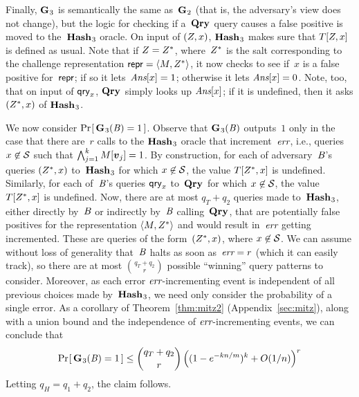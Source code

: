 {Finally, $\textup{\textbf{G}}\hspace{0.5pt}_3$ is semantically the same as~$\textup{\textbf{G}}\hspace{0.5pt}_2$ (that is, the adversary's
view does not change), but the logic for checking if a~$\textup{\textbf{Qry}}\hspace{0.5pt}$ query
causes a false positive is moved to the~$\textup{\textbf{Hash}}\hspace{0.5pt}_3$ oracle.
%
On input of $(Z, x)$, $\textup{\textbf{Hash}}\hspace{0.5pt}_3$ makes sure that $T[Z,x]$ is
defined as usual. Note that if $Z=Z^*$, where~$Z^*$ is the salt
corresponding to the challenge representation $\pub = \str(M, \salt^*)$, it now
checks to see if~$x$ is a false positive for~$\mathsf{repr}$; if so it lets~$\textit{Ans}[x]=1$;
otherwise it lets $\textit{Ans}[x]=0$.
%
Note, too, that on input of $\mathsf{qry}_x$, $\textup{\textbf{Qry}}\hspace{0.5pt}$ simply looks up $\textit{Ans}[x]$; if it is
undefined, then it asks $(Z^*, x)$ of $\textup{\textbf{Hash}}\hspace{0.5pt}_3$.

We now consider $\Pr\hspace{-1pt}\left[\,\textup{\textbf{G}}\hspace{0.5pt}_3(\mathit{B})=1\,\right]$.
%
Observe that $\textup{\textbf{G}}\hspace{0.5pt}_3(\mathit{B})$ outputs~$1$ only in the case that there are~$r$ calls to the
$\textup{\textbf{Hash}}\hspace{0.5pt}_3$ oracle that increment~$\textit{err}$, i.e., queries $x \not\in
\mathcal{S}$ such that $\bigwedge_{j=1}^{k} M[\boldsymbol{v}_j]=1$.
%
By construction, for each of adversary~$\mathit{B}$'s queries $(Z^*, x)$
to~$\textup{\textbf{Hash}}\hspace{0.5pt}_3$ for which $x \not\in \mathcal{S}$, the value $T[Z^*, x]$
is undefined. Similarly, for each of~$\mathit{B}$'s queries $\mathsf{qry}_x$ to~$\textup{\textbf{Qry}}\hspace{0.5pt}$
for which $x \not\in \mathcal{S}$, the value $T[Z^*, x]$ is undefined.
%
Now, there are at most $q_T + q_2$ queries made to~$\textup{\textbf{Hash}}\hspace{0.5pt}_3$, either
directly by~$\mathit{B}$ or indirectly by~$\mathit{B}$ calling~$\textup{\textbf{Qry}}\hspace{0.5pt}$, that are
potentially false positives for the representation $\str(M, \salt^*)$ and would
result in~$\textit{err}$ getting incremented. These are queries of the form~$(Z^*,
x)$, where $x \not\in \mathcal{S}$.
%
We can assume without loss of generality that~$\mathit{B}$ halts as soon as~$\textit{err}=r$
(which it can easily track), so there are at most $\binom{q_T+q_2}{r}$ possible
``winning'' query patterns to consider.
%
Moreover, as each error $\textit{err}$-incrementing event is independent of all previous
choices made by~$\textup{\textbf{Hash}}\hspace{0.5pt}_3$, we need only consider the probability of a single
error. As a corollary of Theorem~\ref{thm:mitz2} (Appendix~\ref{sec:mitz}),
along with a union bound and the independence of $\textit{err}$-incrementing events, we
can conclude that \[
\Pr\hspace{-1pt}\left[\,\textup{\textbf{G}}\hspace{0.5pt}_3(\mathit{B})=1\,\right] \leq \dbinom{q_T + q_2}{r} \left( (1-e^{-kn/m})^k + O(1/n) \right)^r
\]
%
Letting $q_H = q_1 + q_2$, the claim follows.
}

